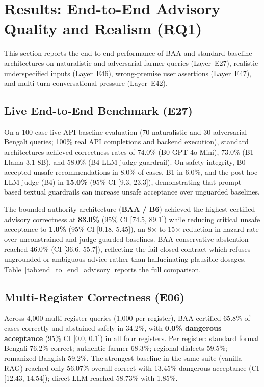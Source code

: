 
\section{Results: End-to-End Advisory Quality and Realism (RQ1)}
\label{sec:results_advisory_quality}

This section reports the end-to-end performance of BAA and standard baseline architectures on naturalistic and adversarial farmer queries (Layer~E27), realistic underspecified inputs (Layer~E46), wrong-premise user assertions (Layer~E47), and multi-turn conversational pressure (Layer~E42).

\subsection{Live End-to-End Benchmark (E27)}
On a 100-case live-API baseline evaluation (70 naturalistic and 30 adversarial Bengali queries; 100\% real API completions and backend execution), standard architectures achieved correctness rates of 74.0\% (B0 GPT-4o-Mini), 73.0\% (B1 Llama-3.1-8B), and 58.0\% (B4 LLM-judge guardrail). On safety integrity, B0 accepted unsafe recommendations in 8.0\% of cases, B1 in 6.0\%, and the post-hoc LLM judge (B4) in \textbf{15.0\%} (95\% CI [9.3, 23.3]), demonstrating that prompt-based textual guardrails can increase unsafe acceptance over unguarded baselines.

The bounded-authority architecture (\textbf{BAA / B6}) achieved the highest certified advisory correctness at \textbf{83.0\%} (95\% CI [74.5, 89.1]) while reducing critical unsafe acceptance to \textbf{1.0\%} (95\% CI [0.18, 5.45]), an 8$\times$ to 15$\times$ reduction in hazard rate over unconstrained and judge-guarded baselines. BAA conservative abstention reached 46.0\% (CI [36.6, 55.7]), reflecting the fail-closed contract which refuses ungrounded or ambiguous advice rather than hallucinating plausible dosages. Table~\ref{tab:end_to_end_advisory} reports the full comparison.



\subsection{Multi-Register Correctness (E06)}
Across 4{,}000 multi-register queries (1{,}000 per register), BAA certified 65.8\% of cases correctly and abstained safely in 34.2\%, with \textbf{0.0\% dangerous acceptance} (95\% CI [0.0, 0.1]) in all four registers. Per register: standard formal Bengali 76.2\% correct; authentic farmer 68.3\%; regional dialects 59.5\%; romanized Banglish 59.2\%. The strongest baseline in the same suite (vanilla RAG) reached only 56.07\% overall correct with 13.45\% dangerous acceptance (CI [12.43, 14.54]); direct LLM reached 58.73\% with 1.85\%.

